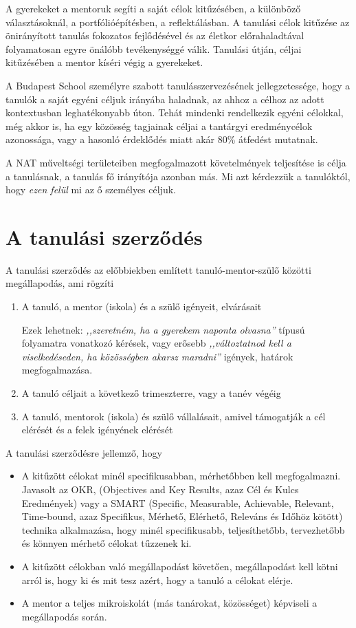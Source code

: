 A gyerekeket a mentoruk segíti a saját célok kitűzésében, a különböző választásoknál, a portfólióépítésben, a reflektálásban. A tanulási célok kitűzése az önirányított tanulás fokozatos fejlődésével és az életkor előrahaladtával folyamatosan egyre önálóbb tevékenységgé válik. Tanulási  útján, céljai kitűzésében a mentor kíséri végig a gyerekeket.

A Budapest School személyre szabott tanulásszervezésének jellegzetessége, hogy a tanulók a saját egyéni céljuk irányába haladnak, az ahhoz a célhoz az adott kontextusban leghatékonyabb úton. Tehát mindenki rendelkezik egyéni célokkal, még akkor is, ha egy közösség tagjainak céljai a tantárgyi eredménycélok azonossága, vagy a hasonló érdeklődés miatt akár  80\% átfedést mutatnak.

A NAT műveltségi területeiben megfogalmazott követelmények teljesítése is célja a tanulásnak, a tanulás fő irányítója azonban más. Mi azt kérdezzük a tanulóktól, hogy \emph{ezen felül} mi az ő személyes céljuk.

\section{A tanulási szerződés}


A tanulási szerződés az előbbiekben említett tanuló-mentor-szülő közötti megállapodás, ami rögzíti
\begin{enumerate}
\item A tanuló, a mentor (iskola) és a szülő igényeit, elvárásait

    Ezek lehetnek: \emph{,,szeretném, ha a gyerekem naponta olvasna''} típusú folyamatra vonatkozó kérések, vagy erősebb \emph{,,változtatnod kell a viselkedéseden, ha közösségben akarsz maradni''} igények, határok megfogalmazása.

\item A tanuló céljait a következő trimeszterre, vagy a tanév végéig

\item A tanuló, mentorok (iskola) és szülő vállalásait, amivel támogatják a cél elérését és a felek igényének elérését

\end{enumerate}

A tanulási szerződésre jellemző, hogy
\begin{itemize}
\item A kitűzött célokat minél specifikusabban, mérhetőbben kell megfogalmazni. Javasolt az OKR,  (Objectives and Key Results, azaz  Cél és Kulcs Eredmények)\cite{okr} vagy a SMART (Specific, Measurable, Achievable, Relevant, Time-bound, azaz Specifikus,  Mérhető, Elérhető, Releváns és Időhöz kötött)\cite{wiki:smart} technika alkalmazása, hogy minél specifikusabb, teljesíthetőbb, tervezhetőbb és könnyen mérhető célokat tűzzenek ki.

\item A kitűzött célokban való megállapodást követően, megállapodást  kell kötni arról is, hogy ki és mit tesz azért, hogy a tanuló a célokat elérje.

\item A mentor a teljes mikroiskolát (más tanárokat, közösséget) képviseli a megállapodás során.
\end{itemize}

